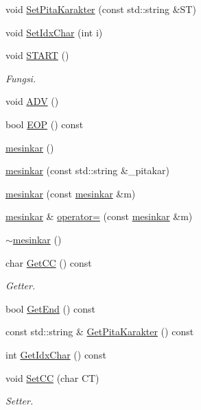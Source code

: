 \begin{DoxyCompactItemize}
\item 
void \hyperlink{classmesinkar_acee0c156b405890e71683621117e3d9a}{Set\-Pita\-Karakter} (const std\-::string \&S\-T)
\item 
void \hyperlink{classmesinkar_a30305750c7833ce3a17f7565093a2374}{Set\-Idx\-Char} (int i)
\item 
void \hyperlink{classmesinkar_a26a3a11395e4f34fb1d73f10af8ef2dd}{S\-T\-A\-R\-T} ()
\begin{DoxyCompactList}\small\item\em Fungsi. \end{DoxyCompactList}\item 
void \hyperlink{classmesinkar_a1a958d5650b913058f5e52694f8e8b22}{A\-D\-V} ()
\item 
bool \hyperlink{classmesinkar_ad767adfdba8d027504095b74d993747d}{E\-O\-P} () const 
\item 
\hyperlink{classmesinkar_a78f0d2bd02734f1fa5ab25f4d5020f53}{mesinkar} ()
\item 
\hyperlink{classmesinkar_a4ed0550ddb17cb7d52ef298b40a25419}{mesinkar} (const std\-::string \&\-\_\-pitakar)
\item 
\hyperlink{classmesinkar_a853e6f4d155a8a1fee72d8542cea262e}{mesinkar} (const \hyperlink{classmesinkar}{mesinkar} \&m)
\item 
\hyperlink{classmesinkar}{mesinkar} \& \hyperlink{classmesinkar_aa8a9fc8c20900d51f5c36a968d9941d0}{operator=} (const \hyperlink{classmesinkar}{mesinkar} \&m)
\item 
\hyperlink{classmesinkar_a5313524822accd8318c051b161261826}{$\sim$mesinkar} ()
\item 
char \hyperlink{classmesinkar_a9e9b6399d071ea89537fc7ce299687a2}{Get\-C\-C} () const 
\begin{DoxyCompactList}\small\item\em Getter. \end{DoxyCompactList}\item 
bool \hyperlink{classmesinkar_a1752c93e058211953708fb680aa089ff}{Get\-End} () const 
\item 
const std\-::string \& \hyperlink{classmesinkar_ac543d480f801887a24990f6adb70cf39}{Get\-Pita\-Karakter} () const 
\item 
int \hyperlink{classmesinkar_ae5e1dcbafbb96c115f78e7348b423824}{Get\-Idx\-Char} () const 
\item 
void \hyperlink{classmesinkar_a8a1896878a983aa61e339b8fc1307881}{Set\-C\-C} (char C\-T)
\begin{DoxyCompactList}\small\item\em Setter. \end{DoxyCompactList}\item 

\end{DoxyCompactItemize}
